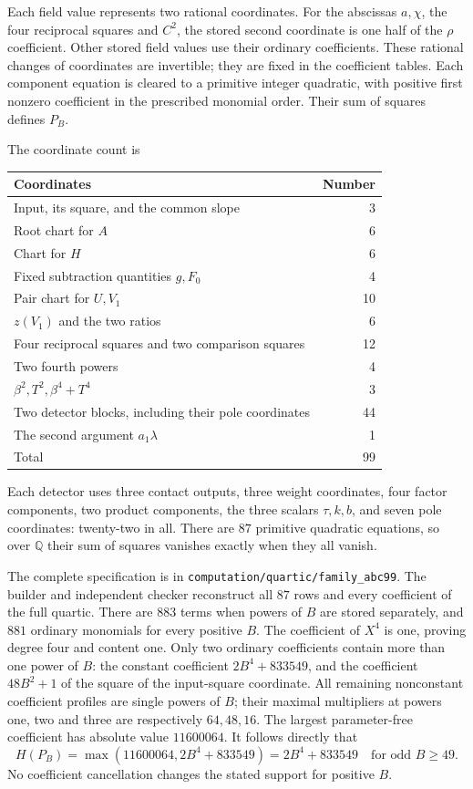 \documentclass[11pt,a4paper]{article}
\newcommand{\Q}{\mathbb Q}\newcommand{\Z}{\mathbb Z}
\begin{document}
Each field value represents two rational coordinates. For the abscissas
$a,\chi$, the four reciprocal squares and $C^2$, the stored second
coordinate is one half of the $\rho$ coefficient. Other stored field
values use their ordinary coefficients. These rational changes of
coordinates are invertible; they are fixed in the coefficient tables.
Each component equation is cleared to a primitive integer quadratic,
with positive first nonzero coefficient in the prescribed monomial order.
Their sum of squares defines $P_B$.

The coordinate count is
\begin{center}
\begin{tabular}{lr}
\toprule
Coordinates & Number\\\midrule
Input, its square, and the common slope &3\\
Root chart for $A$ &6\\
Chart for $H$ &6\\
Fixed subtraction quantities $g,F_0$ &4\\
Pair chart for $U,V_1$ &10\\
$z(V_1)$ and the two ratios &6\\
Four reciprocal squares and two comparison squares &12\\
Two fourth powers &4\\
$\beta^2,T^2,\beta^4+T^4$ &3\\
Two detector blocks, including their pole coordinates &44\\
The second argument $a_1\lambda$ &1\\\midrule
Total &99\\\bottomrule
\end{tabular}
\end{center}
Each detector uses three contact outputs, three weight coordinates,
four factor components, two product components, the three scalars
$\tau,k,b$, and seven pole coordinates: twenty-two in all.
There are $87$ primitive quadratic equations, so over $\Q$ their
sum of squares vanishes exactly when they all vanish.

The complete specification is in
\nolinkurl{computation/quartic/family_abc99}. The builder and independent
checker reconstruct all $87$ rows and every coefficient of the full
quartic. There are $883$ terms when powers of $B$ are stored separately,
and $881$ ordinary monomials for every positive $B$.
The coefficient of $X^4$ is one, proving degree four and content one.
Only two ordinary coefficients contain more than one power of $B$:
the constant coefficient $2B^4+833549$, and the coefficient
$48B^2+1$ of the square of the input-square coordinate.
All remaining nonconstant coefficient profiles are single powers of $B$;
their maximal multipliers at powers one, two and three are respectively
$64,48,16$. The largest parameter-free coefficient has absolute value
$11600064$. It follows directly that
\[
 H(P_B)=\max(11600064,2B^4+833549)
       =2B^4+833549\quad\text{for odd }B\ge49.
\]
No coefficient cancellation changes the stated support for positive $B$.
\end{document}
